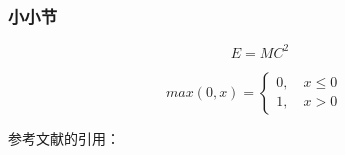 \documentclass[10pt, conference, compsocconf]{IEEEtran}
\begin{document}
\begin{CJK}{UTF8}{gbsn}
\subsubsection{小小节}

\begin{equation}
  E= MC^2
\end{equation}


\begin{equation}
max(0,x)=\left\{
\begin{aligned}
0, \quad x \leq 0 & \\
1, \quad x > 0  &
\end{aligned}
\right.
\end{equation}

参考文献的引用：
\cite{yearbook2005china}

 
   



\end{CJK}
\end{document}

